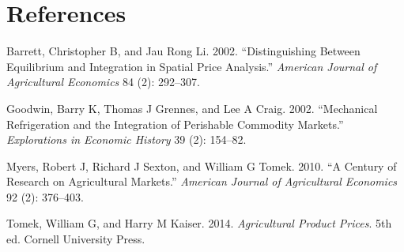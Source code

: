 \documentclass[
]{book}
\begin{document}
\hypertarget{references}{%
\chapter*{References}\label{references}}

\hypertarget{refs}{}
\leavevmode\hypertarget{ref-barrett2002}{}%
Barrett, Christopher B, and Jau Rong Li. 2002. ``Distinguishing Between Equilibrium and Integration in Spatial Price Analysis.'' \emph{American Journal of Agricultural Economics} 84 (2): 292--307.

\leavevmode\hypertarget{ref-goodwin2002}{}%
Goodwin, Barry K, Thomas J Grennes, and Lee A Craig. 2002. ``Mechanical Refrigeration and the Integration of Perishable Commodity Markets.'' \emph{Explorations in Economic History} 39 (2): 154--82.

\leavevmode\hypertarget{ref-myers2010}{}%
Myers, Robert J, Richard J Sexton, and William G Tomek. 2010. ``A Century of Research on Agricultural Markets.'' \emph{American Journal of Agricultural Economics} 92 (2): 376--403.

\leavevmode\hypertarget{ref-tomek2014}{}%
Tomek, William G, and Harry M Kaiser. 2014. \emph{Agricultural Product Prices}. 5th ed. Cornell University Press.
\end{document}
